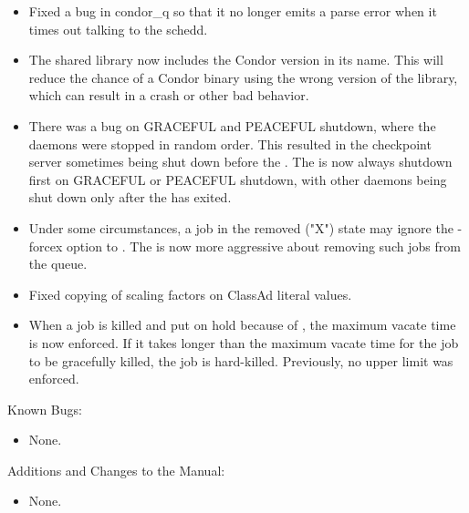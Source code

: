 \begin{itemize}

\item Fixed a bug in condor\_q so that it no longer emits a parse
error when it times out talking to the schedd.

\item The shared library  now includes the Condor
version in its name. This will reduce the chance of a Condor binary
using the wrong version of the library, which can result in a crash or
other bad behavior.

\item There was a bug on GRACEFUL and PEACEFUL shutdown, where the daemons 
were stopped in random order. This resulted in the checkpoint server 
sometimes being shut down before the .  The 
is now always shutdown first on GRACEFUL or PEACEFUL shutdown, with other
daemons being shut down only after the  has exited.

\item Under some circumstances, a job in the removed ("X") state may ignore the -forcex option to .  The  is now more aggressive about removing such jobs from the queue.

\item Fixed copying of scaling factors on ClassAd literal values.

\item When a job is killed and put on hold because of
  , the maximum vacate time is now enforced.  If
  it takes longer than the maximum vacate time for the job to be
  gracefully killed, the job is hard-killed.  Previously, no upper
  limit was enforced.

\end{itemize}

\noindent Known Bugs:

\begin{itemize}

\item None.

\end{itemize}

\noindent Additions and Changes to the Manual:

\begin{itemize}

\item None.

\end{itemize}

